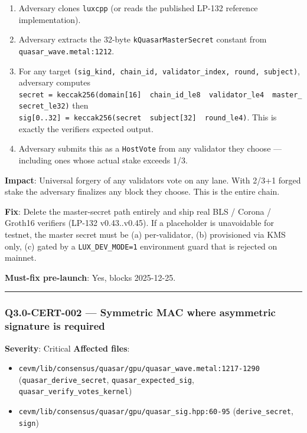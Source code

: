 \documentclass[
]{article}
\providecommand{\tightlist}{%
  \setlength{\itemsep}{0pt}\setlength{\parskip}{0pt}}
\begin{document}
\begin{enumerate}
\def\labelenumi{\arabic{enumi}.}
\tightlist
\item
  Adversary clones \texttt{luxcpp} (or reads the published LP-132
  reference implementation).
\item
  Adversary extracts the 32-byte \texttt{kQuasarMasterSecret} constant
  from \texttt{quasar\_wave.metal:1212}.
\item
  For any target
  \texttt{(sig\_kind,\ chain\_id,\ validator\_index,\ round,\ subject)},
  adversary computes
  \texttt{secret\ =\ keccak256(domain{[}16{]}\ \textbar{}\textbar{}\ chain\_id\_le8\ \textbar{}\textbar{}\ validator\_le4\ \textbar{}\textbar{}\ master\_secret\_le32)}
  then
  \texttt{sig{[}0..32{]}\ =\ keccak256(secret\ \textbar{}\textbar{}\ subject{[}32{]}\ \textbar{}\textbar{}\ round\_le4)}.
  This is exactly the verifier\textquotesingle s expected output.
\item
  Adversary submits this as a \texttt{HostVote} from any validator they
  choose --- including ones whose actual stake exceeds 1/3.
\end{enumerate}

\textbf{Impact}: Universal forgery of any validator\textquotesingle s
vote on any lane. With 2/3+1 forged stake the adversary finalizes any
block they choose. This is the entire chain.

\textbf{Fix}: Delete the master-secret path entirely and ship real BLS /
Corona / Groth16 verifiers (LP-132 v0.43..v0.45). If a placeholder is
unavoidable for testnet, the master secret must be (a) per-validator,
(b) provisioned via KMS only, (c) gated by a \texttt{LUX\_DEV\_MODE=1}
environment guard that is rejected on mainnet.

\textbf{Must-fix pre-launch}: Yes, blocks 2025-12-25.

\begin{center}\rule{0.5\linewidth}{0.5pt}\end{center}

\subsubsection{Q3.0-CERT-002 --- Symmetric MAC where asymmetric
signature is
required}\label{q30-cert-002--symmetric-mac-where-asymmetric-signature-is-required}

\textbf{Severity}: Critical \textbf{Affected files}:

\begin{itemize}
\tightlist
\item
  \texttt{cevm/lib/consensus/quasar/gpu/quasar\_wave.metal:1217-1290}
  (\texttt{quasar\_derive\_secret}, \texttt{quasar\_expected\_sig},
  \texttt{quasar\_verify\_votes\_kernel})
\item
  \texttt{cevm/lib/consensus/quasar/gpu/quasar\_sig.hpp:60-95}
  (\texttt{derive\_secret}, \texttt{sign})
\end{itemize}
\end{document}
